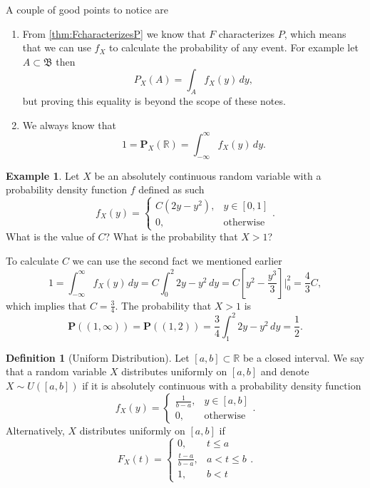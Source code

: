 \documentclass[11pt,a4paper]{article}
\theoremstyle{definition}
\newtheorem{definition}{Definition}[section]
\newtheorem{example}{Example}[section]
\theoremstyle{plain}
\newcommand{\R}{\mathbb{R}}
\begin{document}
  A couple of good points to notice are
  \begin{enumerate}
    \item From \autoref{thm:FcharacterizesP} we know that $F$ characterizes $P$,
    which means that we can use $f_X$ to calculate the probability of any
    event. For example let $A \subset \mathfrak B$ then
    \[
      P_X(A) = \int_{A} f_X(y)\,dy,
    \]
    but proving this equality is beyond the scope of these notes.
    \item We always know that
    \[
      1 = \mathbf P_X(\R) = \int_{-\infty}^{\infty} f_X(y)\,dy.
    \]
  \end{enumerate}

  \begin{example}
    Let $X$ be an absolutely continuous random variable with a probability
    density function $f$ defined as such
    \[
      f_X(y) =
      \begin{cases}
        C(2y - y^2), &y \in [0,1] \\
        0, &\text{otherwise}
      \end{cases}.
    \]
    What is the value of $C$? What is the probability that $X > 1$?

    To calculate $C$ we can use the second fact we mentioned earlier
    \[
      1 =
      \int_{-\infty}^{\infty} f_X(y)\,dy =
      C \int_{0}^{2} 2y - y^2\,dy =
      C\left[y^2 - \frac{y^3}{3}\right]\biggr\vert_{0}^{2} =
      \frac{4}{3} C,
    \]
    which implies that $C = \frac{3}{4}$. The probability that $X > 1$ is
    \[
      \mathbf P\left((1,\infty)\right) =
      \mathbf P\left((1,2)\right) =
      \frac{3}{4} \int_{1}^{2} 2y - y^2\,dy =
      \frac{1}{2}.
    \]
  \end{example}

  \begin{definition}[Uniform Distribution]
    Let $[a,b] \subset \R$ be a closed interval. We say that a random 
    variable $X$ distributes uniformly on $[a,b]$ and denote $X \sim U([a,b])$
    if it is absolutely continuous with a probability density function
    \[
      f_X(y) =
      \begin{cases}
        \frac{1}{b-a}, &y \in [a,b] \\
        0, &\text{otherwise}
      \end{cases}.
    \]
    Alternatively, $X$ distributes uniformly on $[a,b]$ if
    \[
      F_X(t) =
      \begin{cases}
        0, &t \le a \\
        \frac{t-a}{b-a}, &a < t \le b \\
        1, &b < t
      \end{cases}.
    \]
  \end{definition}
\end{document}
